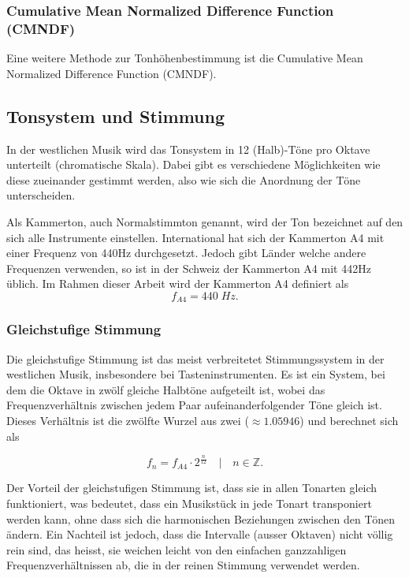 
\subsubsection{Cumulative Mean Normalized Difference Function (CMNDF)}
Eine weitere Methode zur Tonhöhenbestimmung ist die Cumulative Mean Normalized Difference Function (CMNDF).


\subsection{Tonsystem und Stimmung
\label{autotune:subsection:tonsystemUndStimmung}}
In der westlichen Musik wird das Tonsystem in 12 (Halb)-Töne pro Oktave unterteilt (chromatische Skala).
Dabei gibt es verschiedene Möglichkeiten wie diese zueinander gestimmt werden, also wie sich die Anordnung der Töne unterscheiden.

Als Kammerton, auch Normalstimmton genannt, wird der Ton bezeichnet auf den sich alle Instrumente einstellen.
International hat sich der Kammerton A4 mit einer Frequenz von 440\;Hz durchgesetzt.
Jedoch gibt Länder welche andere Frequenzen verwenden, so ist in der Schweiz der Kammerton A4 mit 442\;Hz üblich.
Im Rahmen dieser Arbeit wird der Kammerton A4 definiert als 
\begin{equation}
    f_{A4}
    =
    440\;Hz.
\end{equation}

\subsubsection{Gleichstufige Stimmung
\label{autotune:subsubsection:gleichstuffigeStimmung}}
Die gleichstufige Stimmung ist das meist verbreitetet Stimmungssystem in der westlichen Musik, insbesondere bei Tasteninstrumenten.
Es ist ein System, bei dem die Oktave in zwölf gleiche Halbtöne aufgeteilt ist,
wobei das Frequenzverhältnis zwischen jedem Paar aufeinanderfolgender Töne gleich ist.
Dieses Verhältnis ist die zwölfte Wurzel aus zwei ($\approx 1.05946$) und berechnet sich als

\begin{equation}
    f_n
    =
    f_{A4} \cdot 2^{\frac{n}{12}}
    \quad | \quad
    n \in \mathbb{Z}.
    \label{autotune:equation1}
    \end{equation}

Der Vorteil der gleichstufigen Stimmung ist, dass sie in allen Tonarten gleich funktioniert, was bedeutet,
dass ein Musikstück in jede Tonart transponiert werden kann, ohne dass sich die harmonischen Beziehungen zwischen den Tönen ändern.
Ein Nachteil ist jedoch, dass die Intervalle (ausser Oktaven) nicht völlig rein sind, das heisst,
sie weichen leicht von den einfachen ganzzahligen Frequenzverhältnissen ab, die in der reinen Stimmung verwendet werden.

